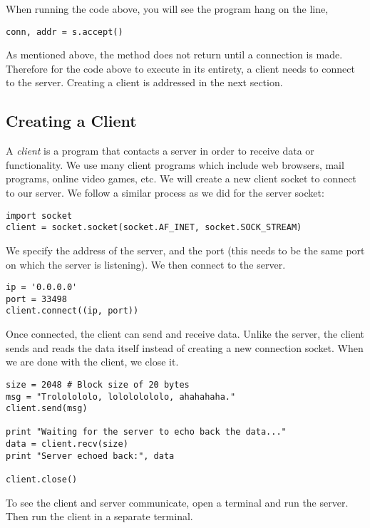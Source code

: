 \begin{warn}
When running the code above, you will see the program hang on the line,
\begin{lstlisting}
conn, addr = s.accept()
\end{lstlisting}
As mentioned above, the  method does not return until a connection is made. Therefore for the code above to execute in its entirety, a client needs to connect to the server. Creating a client is addressed in the next section.
\end{warn}

\subsection*{Creating a Client} %

A \emph{client} is a program that contacts a server in order to receive data or functionality. We use many client programs which include web browsers, mail programs, online video games, etc.
We will create a new client socket to connect to our server.
We follow a similar process as we did for the server socket:

\begin{lstlisting}
import socket
client = socket.socket(socket.AF_INET, socket.SOCK_STREAM)
\end{lstlisting}

We specify the address of the server, and the port (this needs to be the same port on which the server is listening).
We then connect to the server.

\begin{lstlisting}
ip = '0.0.0.0'
port = 33498
client.connect((ip, port))
\end{lstlisting}

Once connected, the client can send and receive data.
Unlike the server, the client sends and reads the data itself instead of creating a new connection socket.
When we are done with the client, we close it.

\begin{lstlisting}
size = 2048 # Block size of 20 bytes
msg = "Trololololo, lolololololo, ahahahaha."
client.send(msg)

print "Waiting for the server to echo back the data..."
data = client.recv(size)
print "Server echoed back:", data

client.close()
\end{lstlisting}

To see the client and server communicate, open a terminal and run the server. Then run the client in a separate terminal.


